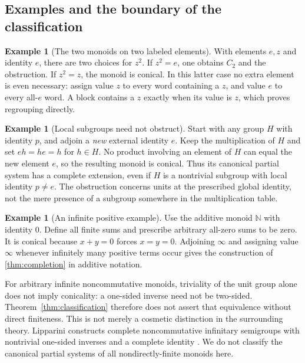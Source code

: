 \documentclass[11pt,letterpaper]{article}
\numberwithin{equation}{section}
\theoremstyle{definition}
\newtheorem{example}[theorem]{Example}
\theoremstyle{remark}
\newcommand{\NN}{\mathbb N}
\begin{document}
\subsection{Examples and the boundary of the classification}
\begin{example}[The two monoids on two labeled elements]
With elements $e,z$ and identity $e$, there are two choices for $z^2$. If $z^2=e$, one obtains $C_2$ and the obstruction. If $z^2=z$, the monoid is conical. In this latter case no extra element is even necessary: assign value $z$ to every word containing a $z$, and value $e$ to every all-$e$ word. A block contains a $z$ exactly when its value is $z$, which proves regrouping directly.
\end{example}

\begin{example}[Local subgroups need not obstruct]
Start with any group $H$ with identity $p$, and adjoin a \emph{new} external identity $e$. Keep the multiplication of $H$ and set $eh=he=h$ for $h\in H$. No product involving an element of $H$ can equal the new element $e$, so the resulting monoid is conical. Thus its canonical partial system has a complete extension, even if $H$ is a nontrivial subgroup with local identity $p\ne e$. The obstruction concerns units at the prescribed global identity, not the mere presence of a subgroup somewhere in the multiplication table.
\end{example}

\begin{example}[An infinite positive example]
Use the additive monoid $\NN$ with identity $0$. Define all finite sums and prescribe arbitrary all-zero sums to be zero. It is conical because $x+y=0$ forces $x=y=0$. Adjoining $\infty$ and assigning value $\infty$ whenever infinitely many positive terms occur gives the construction of \cref{thm:completion} in additive notation.
\end{example}

For arbitrary infinite noncommutative monoids, triviality of the unit group alone does not imply conicality: a one-sided inverse need not be two-sided. Theorem~\ref{thm:classification} therefore does not assert that equivalence without direct finiteness. This is not merely a cosmetic distinction in the surrounding theory. Lipparini constructs complete noncommutative infinitary semigroups with nontrivial one-sided inverses and a complete identity \cite{LippariniInv}. We do not classify the canonical partial systems of all nondirectly-finite monoids here.
\end{document}
